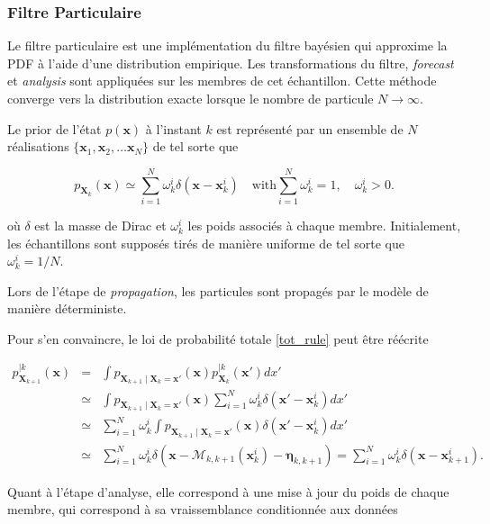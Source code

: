 \subsubsection{Filtre Particulaire}

Le filtre particulaire est une implémentation du filtre bayésien qui approxime la PDF à l'aide d'une distribution empirique. Les transformations du filtre, \textit{forecast} et \textit{analysis} sont appliquées sur les membres de cet échantillon.
Cette méthode converge vers la distribution exacte lorsque le nombre de particule $N \to \infty$.

Le prior de l'état $p(\bm x)$ à l'instant $k$ est représenté par un ensemble de $N$ réalisations $\{\bm x_1, \bm x_2, \dots \bm x_N\}$ de tel sorte que

\begin{equation*}
    p_{\bm X_k}(\bm x) \simeq \sum_{i=1}^N \omega^i_k \delta(\bm x - \bm x_k^i) \quad \text{with} \sum_{i=1}^N \omega^i_k = 1, \quad \omega^i_k > 0.
\end{equation*}

où $\delta$ est la masse de Dirac et $\omega^i_k$ les poids associés à chaque membre. Initialement, les échantillons sont supposés tirés de manière uniforme de tel sorte que $\omega^i_k = 1/N$.

Lors de l'étape de \textit{propagation}, les particules sont propagés par le modèle de manière déterministe.

Pour s'en convaincre, le loi de probabilité totale \ref{tot_rule} peut être réécrite

\begin{eqnarray*}
    p_{\bm X_{k+1}}^{\mid k}(\bm x) &=& \int p_{\bm X_{k+1}\mid \bm X_{k} = \bm x'}(\bm x) p_{\bm X_{k}}^{\mid k}(\bm x')dx' \\
    &\simeq& \int p_{\bm X_{k+1}\mid \bm X_{k} = \bm x'}(\bm x) \sum_{i=1}^N \omega^i_k \delta(\bm x' - \bm x_k^i) dx' \\
    &\simeq& \sum_{i=1}^N \omega^i_k  \int p_{\bm X_{k+1}\mid \bm X_{k} = \bm x'}(\bm x) \delta(\bm x' - \bm x_k^i) dx' \\
    &\simeq& \sum_{i=1}^N \omega^i_k \delta(\bm x - \mathcal M_{k,k+1}(\bm x_k^i) - \bm \eta_{k,k+1}) = \sum_{i=1}^N \omega^i_k \delta(\bm x - \bm x_{k+1}^i).
\end{eqnarray*}

Quant à l'étape d'analyse, elle correspond à une mise à jour du poids de chaque membre, qui correspond à sa vraissemblance conditionnée aux données

